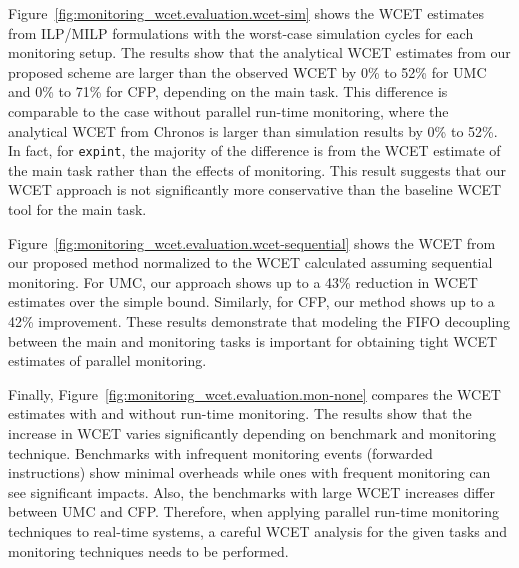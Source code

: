 Figure~\ref{fig:monitoring_wcet.evaluation.wcet-sim} shows the WCET estimates
from ILP/MILP formulations with the worst-case simulation cycles for each
monitoring setup.  The results show that the
analytical WCET estimates from our proposed scheme are larger than the observed
WCET by 0\% to 52\% for UMC and 0\% to 71\% for CFP, depending on the main
task. This difference is comparable to the case without parallel run-time
monitoring, where the analytical WCET from Chronos is larger than simulation
results by 0\% to 52\%.  In fact, for {\tt expint}, the majority of the
difference is from the WCET estimate of the main task rather than the effects
of monitoring.  This result suggests that our WCET approach is not
significantly more conservative than the baseline WCET tool for the main task.

Figure~\ref{fig:monitoring_wcet.evaluation.wcet-sequential} shows the WCET from
our proposed method normalized to the WCET calculated assuming sequential
monitoring.  For UMC, our approach shows up to a 43\%
reduction in WCET estimates over the simple bound. Similarly, for CFP, our
method shows up to a 42\% improvement.  These results demonstrate that modeling
the FIFO decoupling between the main and monitoring tasks is important for
obtaining tight WCET estimates of parallel monitoring. 

Finally, Figure~\ref{fig:monitoring_wcet.evaluation.mon-none}
compares the WCET estimates with and without run-time monitoring.  The results
show that the increase in WCET varies significantly depending on benchmark and
monitoring technique. Benchmarks with infrequent monitoring events (forwarded
instructions) show minimal overheads while ones with frequent monitoring can
see significant impacts.  Also, the benchmarks with large WCET increases differ
between UMC and CFP.  Therefore, when applying parallel run-time monitoring
techniques to real-time systems, a careful WCET analysis for the given tasks
and monitoring techniques needs to be performed. 


